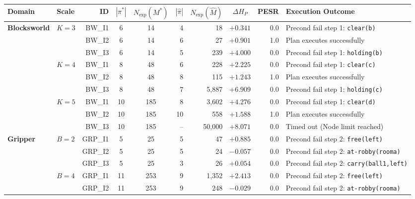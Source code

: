 \documentclass[11pt,a4paper]{article}
\theoremstyle{definition}
\begin{document}
\begin{table}[h!]
\centering
\scriptsize
\begin{tabular}{llrccrrcrl}
\toprule
\textbf{Domain} & \textbf{Scale} & \textbf{ID} & \textbf{$|\pi^*|$} & \textbf{$N_{\text{exp}}(M^*)$} & \textbf{$|\widehat{\pi}|$} & \textbf{$N_{\text{exp}}(\widehat{M})$} & \textbf{$\Delta H_P$} & \textbf{PESR} & \textbf{Execution Outcome} \\
\midrule
\textbf{Blocksworld} & $K=3$ & BW\_I1 & 6 & 14 & 4 & 18 & $+0.341$ & 0.0 & Precond fail step 1: \texttt{clear(b)} \\
                     &       & BW\_I2 & 6 & 14 & 6 & 27 & $+0.901$ & 1.0 & Plan executes successfully \\
                     &       & BW\_I3 & 6 & 14 & 5 & 239 & $+4.000$ & 0.0 & Precond fail step 1: \texttt{holding(b)} \\
\cmidrule{2-10}
                     & $K=4$ & BW\_I1 & 8 & 48 & 6 & 228 & $+2.225$ & 0.0 & Precond fail step 1: \texttt{clear(c)} \\
                     &       & BW\_I2 & 8 & 48 & 8 & 115 & $+1.243$ & 1.0 & Plan executes successfully \\
                     &       & BW\_I3 & 8 & 48 & 7 & 5,887 & $+6.909$ & 0.0 & Precond fail step 1: \texttt{holding(c)} \\
\cmidrule{2-10}
                     & $K=5$ & BW\_I1 & 10 & 185 & 8 & 3,602 & $+4.276$ & 0.0 & Precond fail step 1: \texttt{clear(d)} \\
                     &       & BW\_I2 & 10 & 185 & 10 & 558 & $+1.588$ & 1.0 & Plan executes successfully \\
                     &       & BW\_I3 & 10 & 185 & -- & 50,000 & $+8.071$ & 0.0 & Timed out (Node limit reached) \\
\midrule
\textbf{Gripper}     & $B=2$ & GRP\_I1 & 5 & 25 & 5 & 47 & $+0.885$ & 0.0 & Precond fail step 2: \texttt{free(left)} \\
                     &       & GRP\_I2 & 5 & 25 & 5 & 24 & $-0.057$ & 0.0 & Precond fail step 2: \texttt{at-robby(rooma)} \\
                     &       & GRP\_I3 & 5 & 25 & 3 & 26 & $+0.054$ & 0.0 & Precond fail step 2: \texttt{carry(ball1,left)} \\
\cmidrule{2-10}
                     & $B=4$ & GRP\_I1 & 11 & 253 & 9 & 1,352 & $+2.413$ & 0.0 & Precond fail step 2: \texttt{free(left)} \\
                     &       & GRP\_I2 & 11 & 253 & 9 & 248 & $-0.029$ & 0.0 & Precond fail step 2: \texttt{at-robby(rooma)} \\

\end{tabular}
\end{table}
\end{document}
